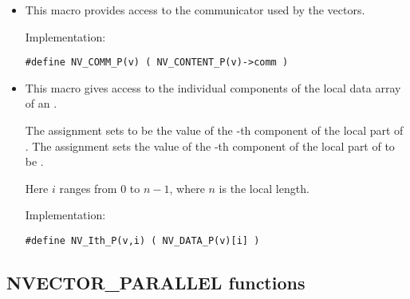 \begin{itemize}
\item {}

  This macro provides access to the {\mpi} communicator used by the {\nvecp}
  vectors.

  Implementation:

  \verb|#define NV_COMM_P(v) ( NV_CONTENT_P(v)->comm )|

\item {}

  This macro gives access to the individual components of the local data
  array of an .

  The assignment  sets  to be the value of 
  the -th component of the local part of . 
  The assignment    
  sets the value of the -th component of the local part of  
  to be .        
  
  Here $i$ ranges from $0$ to $n-1$, where $n$ is the local length.
      
  Implementation:

  \verb|#define NV_Ith_P(v,i) ( NV_DATA_P(v)[i] )|

\end{itemize}


\subsection{NVECTOR\_PARALLEL functions}
\label{ss:nvec_par_functions}

